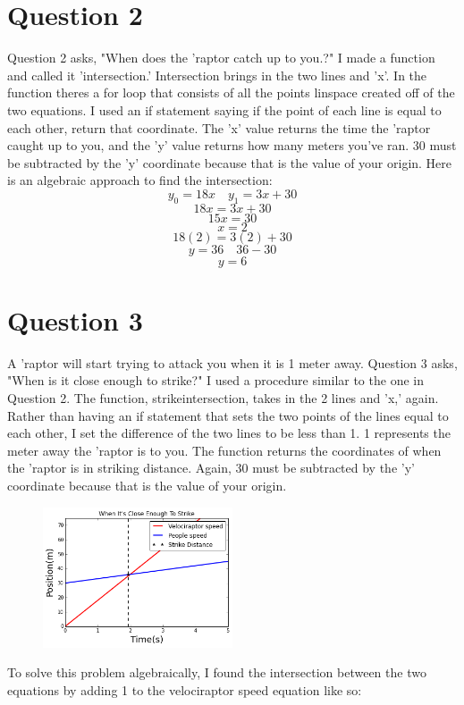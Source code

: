 \documentclass[twocolumn]{revtex4}
\begin{document}
\section{Question 2}
\centering
Question 2 asks, "When does the 'raptor catch up to you.?" I made a function and called it 'intersection.' Intersection brings in the two lines and 'x'. In the function theres a for loop that consists of all the points linspace created off of the two equations. I used an if statement saying if the point of each line is equal to each other, return that coordinate. The 'x' value returns the time the 'raptor caught up to you, and the 'y' value returns how many meters you've ran. 30 must be subtracted by the 'y' coordinate because that is the value of your origin. Here is an algebraic approach to find the intersection:
$$y_0=18x \quad   y_1=3x+30$$
$$  18x=3x+30$$
$$ 15x=30$$
$$x=2$$
$$18(2)=3(2)+30$$
$$y=36 \quad 36- 30$$
$$y=6$$



\pagebreak
\section{Question 3}

A 'raptor will start trying to attack you when it is 1 meter away. Question 3 asks, "When is it close enough to strike?" I used a procedure similar to the one in Question 2. The function, strikeintersection, takes in the 2 lines and 'x,' again. Rather than having an if statement that sets the two points of the lines equal to each other, I set the difference of the two lines to be less than 1. 1 represents the meter away the 'raptor is to you. The function returns the coordinates of when the 'raptor is in striking distance. Again, 30 must be subtracted by the 'y' coordinate because that is the value of your origin.  

\begin{figure}[h!]
\includegraphics[width=0.5\textwidth]{strike.png}
\end{figure}
To solve this problem algebraically, I found the intersection between the two equations by adding 1 to the velociraptor speed equation like so:
\end{document}
